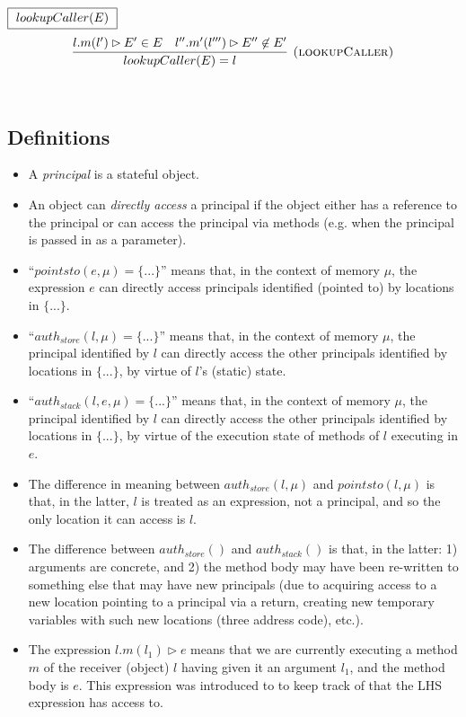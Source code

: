 \documentclass{llncs}
\begin{document}
$\fbox{$~lookupCaller(E)~$}$
\[
\begin{array}{c}
\infer[\textsc{(lookupCaller)}]
  {lookupCaller(E) = l}
  {l.m(l') \rhd E' \in E & l''.m'(l''') \rhd E'' \not\in E'}\\[5ex]
\end{array}
\]


\subsection{Definitions}
\label{sec:definitions}

\begin{itemize}
\item A \textit{principal} is a stateful object.
\item An object can \emph{directly access} a principal if the object either has a reference to the principal or can access the principal via methods (e.g. when the principal is passed in as a parameter).
\item ``$pointsto(e, \mu) = \{ ... \}$'' means that, in the context of memory $\mu$, the expression $e$ can directly access principals identified (pointed to) by locations in $\{ ... \}$.
\item ``$auth_{store}(l, \mu) = \{ ... \}$'' means that, in the context of memory $\mu$, the principal identified by $l$ can directly access the other principals identified by locations in $\{ ... \}$, by virtue of $l$'s (static) state.
\item ``$auth_{stack}(l, e, \mu) = \{ ... \}$'' means that, in the context of memory $\mu$, the principal identified by $l$ can directly access the other principals identified by locations in $\{ ... \}$, by virtue of the execution state of methods of $l$ executing in $e$.
\item The difference in meaning between $auth_{store}(l, \mu)$ and $pointsto(l, \mu)$ is that, in the latter, $l$ is treated as an expression, not a principal, and so the only location it can access is $l$.
\item The difference between $auth_{store}()$ and $auth_{stack}()$ is that, in the latter: 1) arguments are concrete, and 2) the method body may have been re-written to something else that may have new principals (due to acquiring access to a new location pointing to a principal via a return, creating new temporary variables with such new locations (three address code), etc.).
\item The expression $l.m(l_1) \rhd e$ means that we are currently executing a method $m$ of the receiver (object) $l$ having given it an argument $l_1$, and the method body is $e$. This expression was introduced to to keep track of that the LHS expression has access to.

\end{itemize}
\end{document}
